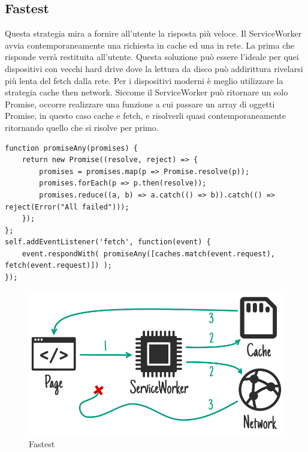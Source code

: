 \documentclass[11pt ,a4paper , twoside , openright ]{article}
\begin{document}
\subsection{Fastest}
Questa strategia mira a fornire all’utente la risposta più veloce. Il ServiceWorker avvia contemporaneamente una richiesta in cache ed una in rete. La prima che risponde verrà restituita all’utente.
Questa soluzione può essere l’ideale per quei dispositivi con vecchi hard drive dove la lettura da disco può addirittura rivelarsi più lenta del fetch dalla rete. Per i dispositivi moderni è meglio utilizzare la strategia cache then network.
Siccome il ServiceWorker può ritornare un solo Promise, occorre realizzare una funzione a cui passare un array di oggetti Promise, in questo caso cache e fetch, e risolverli quasi contemporaneamente ritornando quello che si risolve per primo.
\begin{lstlisting}
function promiseAny(promises) { 
	return new Promise((resolve, reject) => { 
		promises = promises.map(p => Promise.resolve(p)); 
		promises.forEach(p => p.then(resolve)); 
		promises.reduce((a, b) => a.catch(() => b)).catch(() => reject(Error("All failed"))); 
	});
};
self.addEventListener('fetch', function(event) { 
	event.respondWith( promiseAny([caches.match(event.request), fetch(event.request)]) );
});
\end{lstlisting}
\begin{figure}[h]
	\centering
	\includegraphics[width=1\linewidth]{Strategia5}
	\caption{Fastest}
	\label{fig: Fastest}
\end{figure}
\pagebreak
\end{document}
